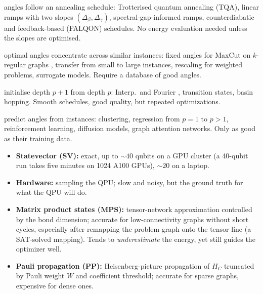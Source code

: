 \documentclass[handoutsbeamer.tex]{subfiles}
\begin{document}
\begin{frame}
\begin{description}\setlength\itemsep{0.2em}
    \item[Physics-inspired] angles follow an annealing schedule: Trotterised quantum annealing (TQA), linear ramps with two slopes $(\Delta_\beta,\Delta_\gamma)$, spectral-gap-informed ramps, counterdiabatic and feedback-based (FALQON) schedules. No energy evaluation needed unless the slopes are optimised.
    \item[Parameter transfer] optimal angles concentrate across similar instances: fixed angles for MaxCut on $k$-regular graphs \citep{Wurtz2021}, transfer from small to large instances, rescaling for weighted problems, surrogate models. Require a database of good angles.
    \item[Iterative] initialise depth $p+1$ from depth $p$: Interp.\ and Fourier \citep{Zhou2020}, transition states, basin hopping. Smooth schedules, good quality, but repeated optimizations.
    \item[Machine learning] predict angles from instances: clustering, regression from $p=1$ to $p>1$, reinforcement learning, diffusion models, graph attention networks. Only as good as their training data.
\end{description}
\end{frame}

\begin{frame}
\begin{itemize}\setlength\itemsep{0.2em}
    \item \textbf{Statevector (SV):} exact, up to $\sim 40$ qubits on a GPU cluster (a 40-qubit run takes five minutes on 1024 A100 GPUs), $\sim 20$ on a laptop.
    \item \textbf{Hardware:} sampling the QPU; slow and noisy, but the ground truth for what the QPU will do.
    \item \textbf{Matrix product states (MPS):} tensor-network approximation controlled by the bond dimension; accurate for low-connectivity graphs without short cycles, especially after remapping the problem graph onto the tensor line (a SAT-solved mapping). Tends to \emph{underestimate} the energy, yet still guides the optimizer well.
    \item \textbf{Pauli propagation (PP):} Heisenberg-picture propagation of $H_C$ truncated by Pauli weight $W$ and coefficient threshold; accurate for sparse graphs, expensive for dense ones.
\end{itemize}
\end{frame}
\end{document}
